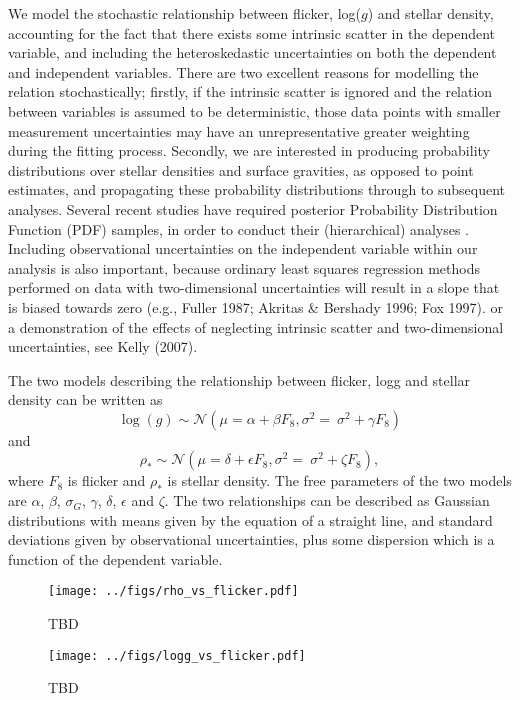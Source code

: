 We model the stochastic relationship between flicker, log($g$) and stellar
density, accounting for the fact that there exists some intrinsic scatter in
the dependent variable, and including the heteroskedastic uncertainties on both
the dependent and independent variables.
There are two excellent reasons for modelling the relation stochastically;
firstly, if the intrinsic scatter is ignored and the relation between
variables is assumed to be deterministic, those data points with smaller
measurement uncertainties may have an unrepresentative greater weighting
during the fitting process.
Secondly, we are interested in producing probability distributions over stellar
densities and surface gravities, as opposed to point estimates, and propagating
these probability distributions through to subsequent analyses.
Several recent studies have required posterior Probability Distribution
Function (PDF) samples, in order to conduct their (hierarchical)
analyses \citep[e.g.][]{Rogers2014, Foreman-Mackey2014, Angus2015}.
Including observational uncertainties on the independent variable within our
analysis is also important, because ordinary least squares regression methods
performed on data with two-dimensional uncertainties will result in a slope
that is biased towards zero
(e.g., Fuller 1987; Akritas \& Bershady 1996; Fox 1997).
or a demonstration of the effects of neglecting intrinsic scatter and
two-dimensional uncertainties, see Kelly (2007).

The two models describing the relationship between flicker, logg and stellar
density can be written as
\begin{equation}
	\log(g) \sim \mathcal{N}(\mu = \alpha + \beta F_8, \sigma^2 = \
	\sigma^2 + \gamma F_8)
\end{equation}
\label{eq:logg}
and
\begin{equation}
	\rho_* \sim \mathcal{N}(\mu = \delta + \epsilon F_8, \sigma^2 = \
	\sigma^2 + \zeta F_8),
\end{equation}
\label{eq:rho}
where $F_8$ is flicker and $\rho_*$ is stellar density.
The free parameters of the two models are $\alpha$, $\beta$, $\sigma_G$,
$\gamma$, $\delta$, $\epsilon$ and $\zeta$.
The two relationships can be described as Gaussian distributions with means
given by the equation of a straight line, and standard deviations given by
observational uncertainties, plus some dispersion which is a function of the
dependent variable.

\begin{figure}
\begin{center}
\texttt{[image: ../figs/rho\_vs\_flicker.pdf]}
\caption{
TBD
}
\label{fig:rhostar}
\end{center}
\end{figure}

\begin{figure}
\begin{center}
\texttt{[image: ../figs/logg\_vs\_flicker.pdf]}
\caption{
TBD
}
\label{fig:logg}
\end{center}
\end{figure}
